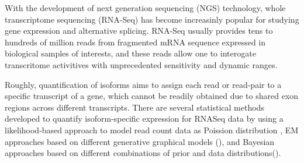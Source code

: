 \documentclass[11pt]{article}
\begin{document}
With the development of next generation sequencing (NGS) technology, whole transcriptome sequencing (RNA-Seq) has become increasinly popular for studying gene expression and alternative splicing. RNA-Seq usually provides tens to hundreds of million reads from fragmented mRNA sequence expressed in biological samples of interests, and these reads allow one to interogate transcritome activitives with unprecedented sensitivity and dynamic ranges.   

Roughly, quantification of isoforms aims to assign each read or read-pair to a specific transcript of a gene, which cannot be readily obtained due to shared exon regions across different transcripts. There are several statistical methods developed to quantify isoform-specific expression for RNASeq data by using a likelihood-based approach to model read count data as Poission distribution \cite{jiang2009statistical}, EM approaches based on different generative graphical models (\cite{roberts2013streaming, li2011rsem}), and Bayesian approaches based on different combinations of prior and data distributions(\cite{glausbitseq}).\\
\end{document}

